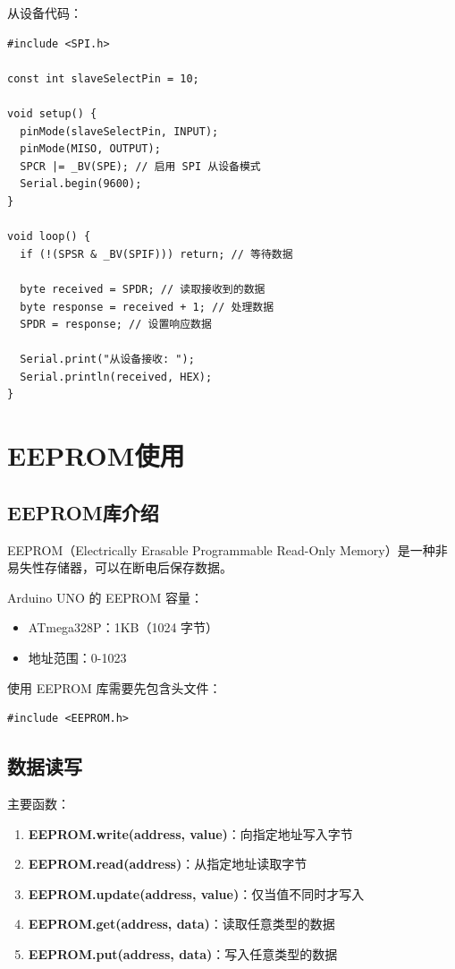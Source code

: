 \documentclass[12pt,UTF8]{ctexbook}
\begin{document}
从设备代码：
\begin{lstlisting}
#include <SPI.h>

const int slaveSelectPin = 10;

void setup() {
  pinMode(slaveSelectPin, INPUT);
  pinMode(MISO, OUTPUT);
  SPCR |= _BV(SPE); // 启用 SPI 从设备模式
  Serial.begin(9600);
}

void loop() {
  if (!(SPSR & _BV(SPIF))) return; // 等待数据
  
  byte received = SPDR; // 读取接收到的数据
  byte response = received + 1; // 处理数据
  SPDR = response; // 设置响应数据
  
  Serial.print("从设备接收: ");
  Serial.println(received, HEX);
}
\end{lstlisting}

\chapter{EEPROM使用}

\section{EEPROM库介绍}

EEPROM（Electrically Erasable Programmable Read-Only Memory）是一种非易失性存储器，可以在断电后保存数据。

Arduino UNO 的 EEPROM 容量：
\begin{itemize}
    \item ATmega328P：1KB（1024 字节）
    \item 地址范围：0-1023
\end{itemize}

使用 EEPROM 库需要先包含头文件：
\begin{lstlisting}
#include <EEPROM.h>
\end{lstlisting}

\section{数据读写}

主要函数：
\begin{enumerate}
    \item \textbf{EEPROM.write(address, value)}：向指定地址写入字节
    \item \textbf{EEPROM.read(address)}：从指定地址读取字节
    \item \textbf{EEPROM.update(address, value)}：仅当值不同时才写入
    \item \textbf{EEPROM.get(address, data)}：读取任意类型的数据
    \item \textbf{EEPROM.put(address, data)}：写入任意类型的数据
\end{enumerate}
\end{document}

